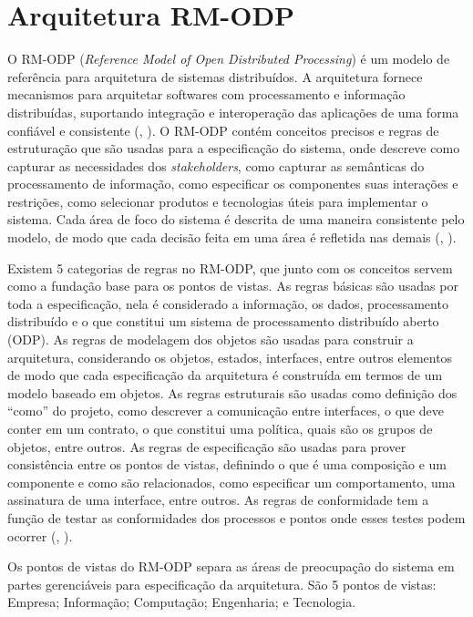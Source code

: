 \documentclass[]{politex}
\begin{document}
\section{Arquitetura RM-ODP}
O RM-ODP (\textit{Reference Model of Open Distributed Processing}) é um modelo de referência para arquitetura de sistemas distribuídos. A arquitetura fornece mecanismos para arquitetar softwares com processamento e informação distribuídas, suportando integração e interoperação das aplicações de uma forma confiável e consistente  (, \citeyear{putman2001architecting}). O RM-ODP contém conceitos precisos e regras de estruturação que são usadas para a especificação do sistema, onde descreve como capturar as necessidades dos \textit{stakeholders}, como capturar as semânticas do processamento de informação, como especificar os componentes suas interações e restrições, como selecionar produtos e tecnologias úteis para implementar o sistema. Cada área de foco do sistema é descrita de uma maneira consistente pelo modelo, de modo que cada decisão feita em uma área é refletida nas demais  (, \citeyear{putman2001architecting}). 

Existem 5 categorias de regras no RM-ODP, que junto com os conceitos servem como a fundação base para os pontos de vistas. As regras básicas são usadas por toda a especificação, nela é considerado a informação, os dados, processamento distribuído e o que constitui um sistema de processamento distribuído aberto (ODP). As regras de modelagem dos objetos são usadas para construir a arquitetura, considerando os objetos, estados, interfaces, entre outros elementos de modo que cada especificação da arquitetura é construída em termos de um modelo baseado em objetos. As regras estruturais são usadas como definição dos “como” do projeto, como descrever a comunicação entre interfaces, o que deve conter em um contrato, o que constitui uma política, quais são os grupos de objetos, entre outros. As regras de especificação são usadas para prover consistência entre os pontos de vistas, definindo o que é uma composição e um componente e como são relacionados, como especificar um comportamento, uma assinatura de uma interface, entre outros. As regras de conformidade tem a função de testar as conformidades dos processos e pontos onde esses testes podem ocorrer (, \citeyear{putman2001architecting}).

Os pontos de vistas do RM-ODP separa as áreas de preocupação do sistema em partes gerenciáveis para especificação da arquitetura. São 5 pontos de vistas: Empresa; Informação; Computação; Engenharia; e Tecnologia.
\end{document}
